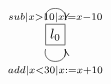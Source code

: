 $\xymatrix{
   \fbox{$l_0$} \ar@(ul,ur)[]_{sub | x > 10 | x := x - 10} \ar@(dl,dr)[]_{add | x < 30 | x := x + 10}
}$
